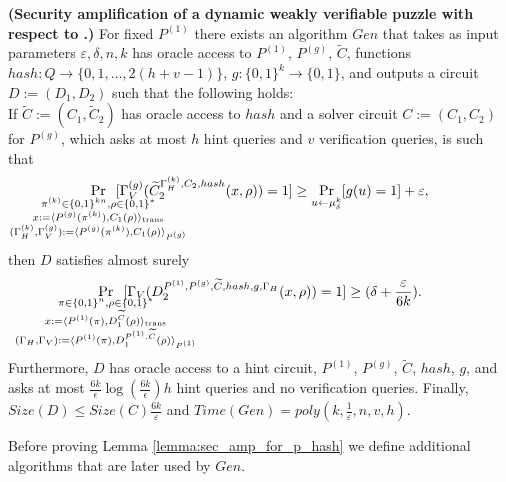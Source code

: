 %
%
\begin{lemma}\textbf{(Security amplification of a dynamic weakly verifiable puzzle with respect to .)}
  \label{lemma:sec_amp_for_p_hash}
  For fixed $P^{(1)}$ there exists an algorithm $Gen$ that takes as input parameters $\varepsilon, \delta, n, k$
  has oracle access to $P^{(1)}$, $P^{(g)}$, $\widetilde{C}$, functions $hash : Q \rightarrow \{0,1,\dots, 2(h+v-1)\}$, $g: \{0,1\}^{k} \rightarrow \{0,1\}$,
  and outputs a circuit $D := (D_1, D_2)$ such that the following holds: \\
  If $\widetilde{C} := (C_1, \widetilde{C}_2)$ has oracle access to $hash$ and a solver circuit $C := (C_1, C_2)$ for $P^{(g)}$,
  which asks at most $h$ hint queries and $v$ verification queries, is such that
  \begin{align*}
    \underset{\mathclap{\substack{
          \pi^{(k)} \in \{0,1\}^{kn}, \rho \in \{0,1\}^{*} \\
          x:= \langle P^{(g)}(\pi^{(k)}), {C}_1(\rho) \rangle_{\text{trans}} \\
          (\Gamma_H^{(k)}, \Gamma_V^{(g)}) := \langle P^{(g)}(\pi^{(k)}), C_1(\rho) \rangle_{P^{(g)}}}}}
    {\Pr}\mkern13mu[\Gamma_V^{(g)}(\widetilde{C}_2^{\Gamma_H^{(k)}, C_2, hash}(x,\rho)) = 1]
    \geq \underset{u \leftarrow \mu_\delta^k}{\Pr}[g(u) = 1] + \varepsilon,
  \end{align*}
  then $D$ satisfies almost surely
  \begin{align*}
    \underset{
      \mathclap{
      \substack{
        \pi \in \{0,1\}^{n}, \rho \in \{0,1\}^{*} \\
        x := \langle P^{(1)}(\pi), D_1^{\widetilde{C}}(\rho) \rangle_{\text{trans}} \\
        (\Gamma_H, \Gamma_V) := \langle P^{(1)}(\pi), D_1^{P^{(1)}, \widetilde{C}}(\rho) \rangle_{P^{(1)}}}}}
    {\Pr}\mkern13mu[\Gamma_V(D_2^{P^{(1)}, P^{(g)}, \widetilde{C}, hash, g, \Gamma_H}(x, \rho)) = 1] \geq (\delta + \frac{\varepsilon}{6k}).
  \end{align*}
  Furthermore, $D$ has oracle access to a hint circuit, $P^{(1)}$, $P^{(g)}$,  $\widetilde{C}$, $hash$, $g$, and
  asks at most $\frac{6k}{\epsilon}\log\left(\frac{6k}{\epsilon}\right) h$ hint queries and no verification queries.
  Finally, $Size(D) \leq Size(C)\frac{6k}{\varepsilon}$ and $Time(Gen) = poly(k, \frac{1}{\varepsilon}, n, v, h)$.
\end{lemma}
%
%
Before proving Lemma \ref{lemma:sec_amp_for_p_hash} we define additional algorithms that are later used by $Gen$.
